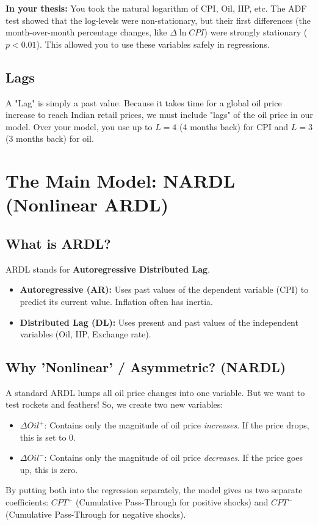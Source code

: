 \documentclass[12pt,a4paper]{report}
\begin{document}
\textbf{In your thesis:} You took the natural logarithm of CPI, Oil, IIP, etc. The ADF test showed that the log-levels were non-stationary, but their first differences (the month-over-month percentage changes, like $\Delta \ln CPI$) were strongly stationary ($p < 0.01$). This allowed you to use these variables safely in regressions.

\section{Lags}
A "Lag" is simply a past value. Because it takes time for a global oil price increase to reach Indian retail prices, we must include "lags" of the oil price in our model. Over your model, you use up to $L=4$ (4 months back) for CPI and $L=3$ (3 months back) for oil.

\newpage
\chapter{The Main Model: NARDL (Nonlinear ARDL)}

\section{What is ARDL?}
ARDL stands for \textbf{Autoregressive Distributed Lag}.
\begin{itemize}
    \item \textbf{Autoregressive (AR):} Uses past values of the dependent variable (CPI) to predict its current value. Inflation often has inertia.
    \item \textbf{Distributed Lag (DL):} Uses present and past values of the independent variables (Oil, IIP, Exchange rate).
\end{itemize}

\section{Why 'Nonlinear' / Asymmetric? (NARDL)}
A standard ARDL lumps all oil price changes into one variable. But we want to test rockets and feathers! So, we create two new variables:
\begin{itemize}
    \item $\Delta Oil^+$: Contains only the magnitude of oil price \textit{increases}. If the price drops, this is set to 0.
    \item $\Delta Oil^-$: Contains only the magnitude of oil price \textit{decreases}. If the price goes up, this is zero.
\end{itemize}
By putting both into the regression separately, the model gives us two separate coefficients: $CPT^+$ (Cumulative Pass-Through for positive shocks) and $CPT^-$ (Cumulative Pass-Through for negative shocks).
\end{document}
